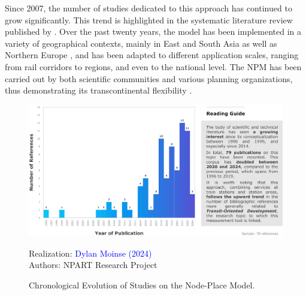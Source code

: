 \begin{refsegment}
Since 2007, the number of studies dedicated to this approach has continued to grow significantly. This trend is highlighted in the systematic literature review published by \textcolor{blue}{\textcite[383]{ibrahim_planning_2022}}. Over the past twenty years, the model has been implemented in a variety of geographical contexts, mainly in East and South Asia as well as Northern Europe \textcolor{blue}{\autocite[1]{caset_integrating_2020}}, and has been adapted to different application scales, ranging from rail corridors to regions, and even to the national level. The \acrshort{NPM} has been carried out by both scientific communities and various planning organizations, thus demonstrating its transcontinental flexibility \textcolor{blue}{\autocite[1]{caset_integrating_2020}}.%

    \begin{figure}[h!]\vspace*{4pt}
        \caption{Chronological Evolution of Studies on the Node-Place Model.}
        \label{fig-chap6:litterature-chronologie}
        \centerline{\includegraphics[width=1\columnwidth]{src/Figures/Chap-6/EN_NPART_Chronologie.pdf}}
        \vspace{5pt}
        \begin{flushright}\scriptsize{
        Realization: \textcolor{blue}{Dylan Moinse (2024)}
        \\
        Authors: \acrshort{NPART} Research Project
        }\end{flushright}
    \end{figure}


\end{refsegment}
